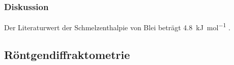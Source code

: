 \documentclass[
	a4paper,
	12pt,
	pagesize,
	ngerman
]{scrartcl}
\begin{document}
	\subsubsection{Diskussion}

	Der Literaturwert der Schmelzenthalpie von Blei beträgt \SI{4,8}{\kilo \joule \per \mol} \cite{blei_enthalpie}.
	\subsection{Röntgendiffraktometrie}
\end{document}
